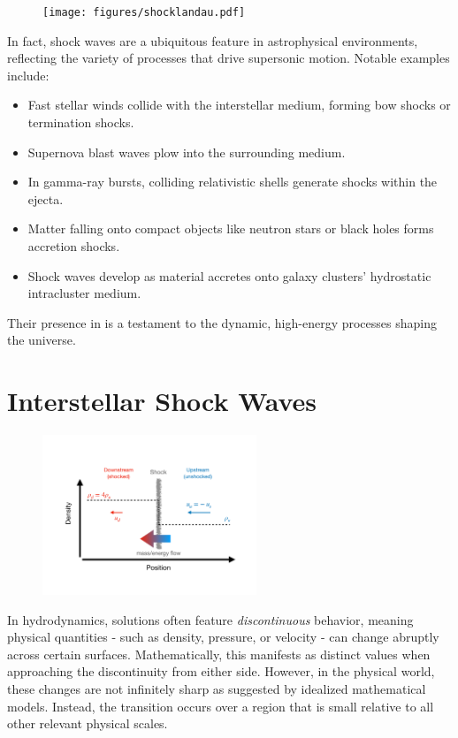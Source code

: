 \begin{figure}[!t]
\centering
\texttt{[image: figures/shocklandau.pdf]}
\caption{}
\label{fig:landau}
\end{figure}

In fact, shock waves are a ubiquitous feature in astrophysical environments, reflecting the variety of processes that drive supersonic motion. 
%
Notable examples include:
\begin{itemize}
\item Fast stellar winds collide with the interstellar medium, forming bow shocks or termination shocks.  
\item Supernova blast waves plow into the surrounding medium.  
\item In gamma-ray bursts, colliding relativistic shells generate shocks within the ejecta.  
\item Matter falling onto compact objects like neutron stars or black holes forms accretion shocks.  
\item Shock waves develop as material accretes onto galaxy clusters' hydrostatic intracluster medium.  
\end{itemize}

Their presence in is a testament to the dynamic, high-energy processes shaping the universe.

\section{Interstellar Shock Waves}

\begin{figure}[!t]
\centering
\includegraphics[width=0.57\textwidth]{figures/shockflow.pdf}
\caption{}\label{fig:shockflow}
\end{figure}

In hydrodynamics, solutions often feature \emph{discontinuous} behavior, meaning physical quantities - such as density, pressure, or velocity - can change abruptly across certain surfaces. Mathematically, this manifests as distinct values when approaching the discontinuity from either side. However, in the physical world, these changes are not infinitely sharp as suggested by idealized mathematical models. Instead, the transition occurs over a region that is small relative to all other relevant physical scales.

